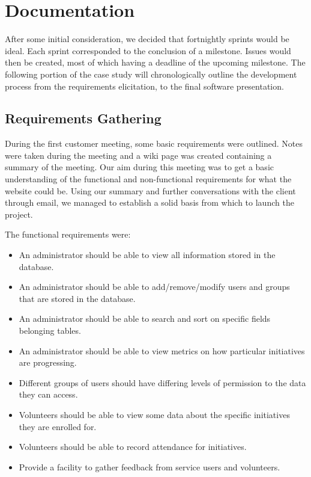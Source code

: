 \documentclass{l3proj}
\begin{document}
\section{Documentation}
\label{documentation}

After some initial consideration, we decided that fortnightly sprints would be ideal. Each sprint corresponded to the conclusion of a milestone. Issues would then be created, most of which having a deadline of the upcoming milestone. The following portion of the case study will chronologically outline the development process from the requirements elicitation, to the final software presentation.

\subsection{Requirements Gathering}
\label{requirements}

During the first customer meeting, some basic requirements were outlined. Notes were taken during the meeting and a wiki page was created containing a summary of the meeting. Our aim during this meeting was to get a basic understanding of the functional and non-functional requirements for what the website could be. Using our summary and further conversations with the client through email, we managed to establish a solid basis from which to launch the project.

The functional requirements were:
\begin{itemize}
\item An administrator should be able to view all information stored in the database.
\item An administrator should be able to add/remove/modify users and groups that are stored in the database.
\item An administrator should be able to search and sort on specific fields belonging tables.
\item An administrator should be able to view metrics on how particular initiatives are progressing.
\item Different groups of users should have differing levels of permission to the data they can access.
\item Volunteers should be able to view some data about the specific initiatives they are enrolled for.
\item Volunteers should be able to record attendance for initiatives.
\item Provide a facility to gather feedback from service users and volunteers.
\end{itemize}
\end{document}
